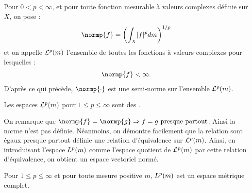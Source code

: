 \begin{defn}
Pour $0< p < \infty$, et pour toute fonction mesurable à valeurs complexes définie sur $X$, on pose :
\[ \normp{f} = \left ( \int_X \abs{f}^p dm \right )^{1/p} \]
et on appelle $\mathcal{L}^p(m)$ l'ensemble de toutes les fonctions à valeurs complexes pour lesquelles :
\[ \normp{f} < \infty . \]
D'après ce qui précède, $\normp{\cdot}$ est une semi-norme sur l'ensemble $\mathcal{L}^p(m)$.
\end{defn}

\begin{lem}
Les espaces $\mathcal{L}^p(m)$ pour $1 \leq p \leq \infty$ sont des \Cev.
\end{lem}

\begin{rmq}
On remarque que $\normp{f} = \normp{g} \Rightarrow f =g  \pp$. Ainsi la norme n'est pas définie.
Néanmoins, on démontre facilement que la relation \og sont égaux presque partout \fg{} définie une relation d'équivalence sur 
$\mathcal{L}^p(m)$. Ainsi, en introduisant l'espace $L^p(m)$ comme l'espace quotient de $\mathcal{L}^p(m)$ par cette relation d'équivalence, 
on obtient un espace vectoriel normé.
\end{rmq}

\begin{thm}
Pour $1 \leq p \leq \infty$ et pour toute mesure positive $m$, $L^p(m)$ est un espace métrique complet.
\end{thm}

